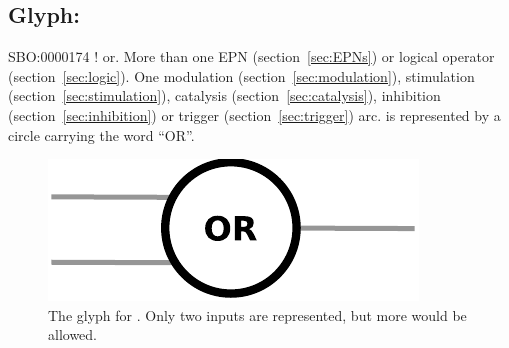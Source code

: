 \subsection{Glyph: }\label{sec:or}

\begin{glyphDescription}
 \glyphSboTerm SBO:0000174 ! or.
 \glyphOrigin More than one EPN (section~\ref{sec:EPNs}) or logical operator (section~\ref{sec:logic}).
 \glyphTarget  One modulation (section~\ref{sec:modulation}), stimulation (section~\ref{sec:stimulation}), catalysis (section~\ref{sec:catalysis}), inhibition (section~\ref{sec:inhibition}) or trigger (section~\ref{sec:trigger}) arc.
 \glyphNode {} is represented by a circle carrying the word ``OR''.
 \end{glyphDescription}

\begin{figure}[H]
  \centering
  \includegraphics[scale = 0.5]{images/or}
  \caption{The \PD glyph for . Only two inputs are represented, but more would be allowed.}
  \label{fig:or}
\end{figure}



